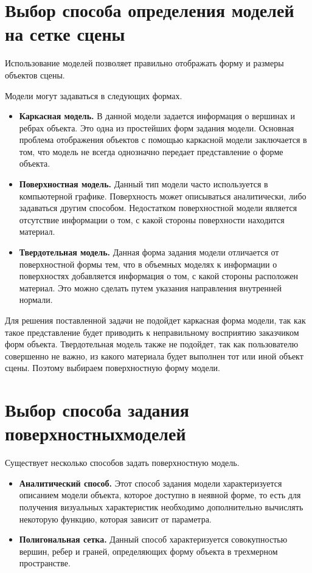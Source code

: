 \documentclass[a4paper,14pt, unknownkeysallowed]{extreport}
\begin{document}
\section{Выбор способа определения моделей на сетке сцены}

Использование моделей позволяет правильно отображать форму и размеры объектов сцены. 

Модели могут задаваться в следующих формах.

\begin{itemize}
	\item \textbf{Каркасная модель.} В данной модели задается информация о вершинах и ребрах объекта. Это одна из простейших форм задания модели. Основная проблема отображения объектов с помощью каркасной модели заключается в том, что модель не всегда однозначно передает представление о форме объекта.
	\item \textbf{Поверхностная модель.} Данный тип модели часто используется в компьютерной графике. Поверхность может описываться аналитически, либо задаваться другим способом. Недостатком поверхностной модели является отсутствие информации о том, с какой стороны поверхности находится материал.
	\item \textbf{Твердотельная модель.} Данная форма задания модели отличается от поверхностной формы тем, что в объемных моделях к информации о поверхностях добавляется информация о том, с какой стороны расположен материал. Это можно сделать путем указания направления внутренней нормали.
\end{itemize}

Для решения поставленной задачи не подойдет каркасная форма модели, так как такое представление будет приводить к неправильному восприятию заказчиком форм объекта. Твердотельная модель также не подойдет, так как пользователю совершенно не важно, из какого материала будет выполнен тот или иной объект сцены. Поэтому выбираем поверхностную форму модели.

\section[Выбор способа задания поверхностных моделей]{Выбор способа задания поверхностных\linebreak моделей}

Существует несколько способов задать поверхностную модель.

\begin{itemize}
	\item \textbf{Аналитический способ.} Этот способ задания модели характеризуется описанием модели объекта, которое доступно в неявной форме, то есть для получения визуальных характеристик необходимо дополнительно вычислять некоторую функцию, которая зависит от параметра.
	\item \textbf{Полигональная сетка.} Данный способ характеризуется совокупностью вершин, ребер и граней, определяющих форму объекта в трехмерном пространстве.
\end{itemize}
\end{document}
